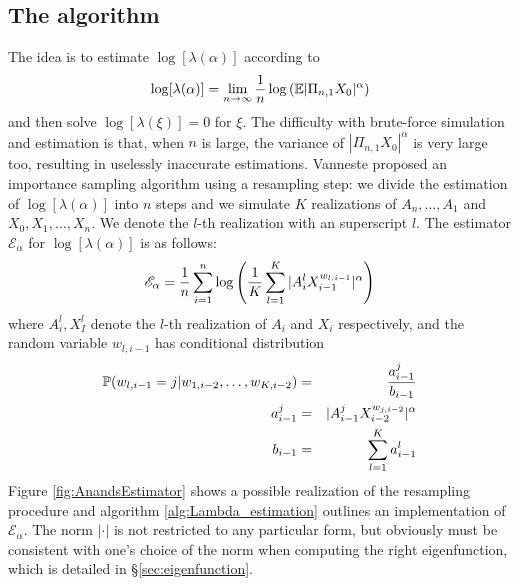 \subsection{The algorithm}
The idea is to estimate $\log[\lambda (\alpha)]$ according to
\begin{equation}
  \label{eq:Lambda}
  \log[\lambda(\alpha)] = \lim_{n \to \infty}{1 \over n} \log \left(
    \E |\Pi_{n, 1} X_0|^\alpha
  \right)
\end{equation}
and then solve $\log[\lambda(\xi)] = 0$ for $\xi$. The difficulty with
brute-force simulation and estimation is that, when $n$ is large, the
variance of $|\Pi_{n, 1} X_0|^\alpha$ is very large too, resulting in
uselessly inaccurate estimations. Vanneste \cite{vanneste:2010}
proposed an importance sampling algorithm using a resampling step: we
divide the estimation of $\log[\lambda(\alpha)]$ into $n$ steps and we
simulate $K$ realizations of $A_n, \dots, A_1$ and $X_0, X_1, \dots,
X_n$. We denote the $l$-th realization with an superscript $l$. The
estimator $\mathscr E_\alpha$ for $\log[\lambda(\alpha)]$ is as follows:
\begin{equation}
  \label{eq:AnandsEstimator}
  \mathscr E_\alpha =
  {1 \over n}
  \sum_{i=1}^n \log \left(
    {1 \over K}\sum_{l=1}^K |A_i^l X^{w_{l, i-1}}_{i-1}|^\alpha
  \right)
\end{equation}
where $A_i^l, X_I^l$ denote the $l$-th realization of $A_i$ and $X_i$
respectively, and the random variable $w_{l, i-1}$ has conditional
distribution
\begin{eqnarray*}
  \P(w_{l, i-1} = j | w_{1, i-2}, \dots, w_{K, i-2}) &=& {a^j_{i-1} \over b_{i-1}} \\
  a_{i-1}^j &=& |A_{i-1}^j X_{i-2}^{w_{j, i-2}}|^\alpha \\
  b_{i-1} &=& \sum_{l=1}^K a_{i-1}^l
\end{eqnarray*}
Figure \ref{fig:AnandsEstimator} shows a possible realization of the
resampling procedure and algorithm \ref{alg:Lambda_estimation}
outlines an implementation of $\mathscr E_\alpha$. The norm $|\cdot|$
is not restricted to any particular form, but obviously must be
consistent with one's choice of the norm when computing the right
eigenfunction, which is detailed in \S\ref{sec:eigenfunction}.
